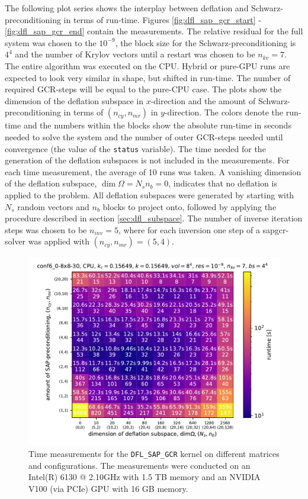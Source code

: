 \documentclass{article}
\theoremstyle{plain} %
\theoremstyle{convention} %
\theoremstyle{remark} %
\def\code#1{\texttt{#1}}
\numberwithin{equation}{section}
\begin{document}
The following plot series shows the interplay between deflation and Schwarz-preconditioning in terms of run-time. Figures \ref{fig:dfl_sap_gcr_start} - \ref{fig:dfl_sap_gcr_end} contain the measurements. The relative residual for the full system was chosen to the $10^{-9}$, the block size for the Schwarz-preconditioning is $4^4$ and the number of Krylov vectors until a restart was chosen to be $n_{kv} = 7$. The entire algorithm was executed on the CPU. Hybrid or pure-GPU runs are expected to look very similar in shape, but shifted in run-time. The number of required GCR-steps will be equal to the pure-CPU case. The plots show the dimension of the deflation subspace in $x$-direction and the amount of Schwarz-preconditioning in terms of $(n_{cy},n_{mr})$ in $y$-direction. The colors denote the run-time and the numbers within the blocks show the absolute run-time in seconds needed to solve the system and the number of outer GCR-steps needed until convergence (the value of the \code{status} variable). The time needed for the generation of the deflation subspaces is not included in the measurements. For each time measurement, the average of \num{10} runs was taken. A vanishing dimension of the deflation subspace, $\dim \Omega = N_s n_b = 0$, indicates that no deflation is applied to the problem. All deflation subspaces were generated by starting with $N_s$ random vectors and $n_b$ blocks to project onto, followed by applying the procedure described in section \ref{sec:dfl_subspace}. The number of inverse iteration steps was chosen to be $n_{inv} = 5$, where for each inversion one step of a \acrshort*{sapgcr}-solver was applied with $(n_{cy}, n_{mr}) = (5,4)$.

\begin{figure}[h]
    \centering
    \includegraphics[width=1.0\textwidth]{plots/dfl_sap_gcr_conf6_0-8x8-30_8x8x8x8_k_0.15649}
    \caption{Time measurements for the \code{DFL\_SAP\_GCR} kernel on different matrices and configurations. The measurements were conducted on an Intel(R) 6130 @ 2.10GHz with 1.5 TB memory and an NVIDIA V100 (via PCIe) GPU with 16 GB memory.}
    \label{fig:dfl_sap_gcr0}
    \label{fig:dfl_sap_gcr_start}
    \label{fig:dfl_sap_gcr_conf6_0-8x8-30_8x8x8x8_k_0.15649}
\end{figure}
\end{document}
